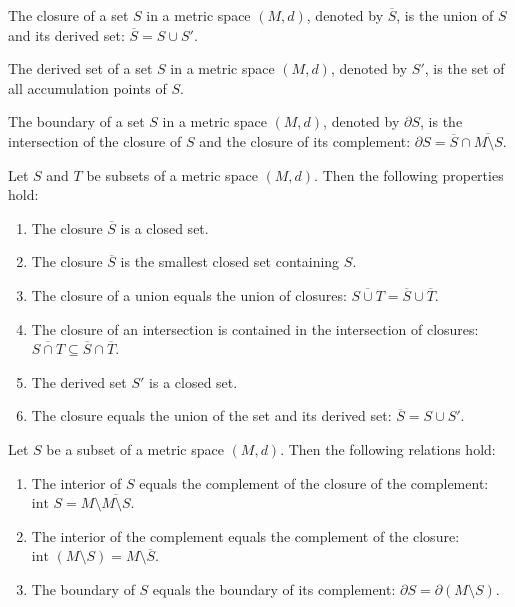 \begin{definition}
The closure of a set $S$ in a metric space $(M,d)$, denoted by $\overline{S}$, is the union of $S$ and its derived set: $\overline{S} = S \cup S'$.
\end{definition}

\begin{definition}
The derived set of a set $S$ in a metric space $(M,d)$, denoted by $S'$, is the set of all accumulation points of $S$.
\end{definition}

\begin{definition}
The boundary of a set $S$ in a metric space $(M,d)$, denoted by $\partial S$, is the intersection of the closure of $S$ and the closure of its complement: $\partial S = \overline{S} \cap \overline{M \setminus S}$.
\end{definition}

\begin{theorem}
Let $S$ and $T$ be subsets of a metric space $(M,d)$. Then the following properties hold:
\begin{enumerate}
\item The closure $\overline{S}$ is a closed set.
\item The closure $\overline{S}$ is the smallest closed set containing $S$.
\item The closure of a union equals the union of closures: $\overline{S \cup T} = \overline{S} \cup \overline{T}$.
\item The closure of an intersection is contained in the intersection of closures: $\overline{S \cap T} \subseteq \overline{S} \cap \overline{T}$.
\item The derived set $S'$ is a closed set.
\item The closure equals the union of the set and its derived set: $\overline{S} = S \cup S'$.
\end{enumerate}
\end{theorem}

\begin{theorem}
Let $S$ be a subset of a metric space $(M,d)$. Then the following relations hold:
\begin{enumerate}
\item The interior of $S$ equals the complement of the closure of the complement: $\text{int } S = M \setminus \overline{M \setminus S}$.
\item The interior of the complement equals the complement of the closure: $\text{int }(M \setminus S) = M \setminus \overline{S}$.
\item The boundary of $S$ equals the boundary of its complement: $\partial S = \partial(M \setminus S)$.
\end{enumerate}
\end{theorem}

